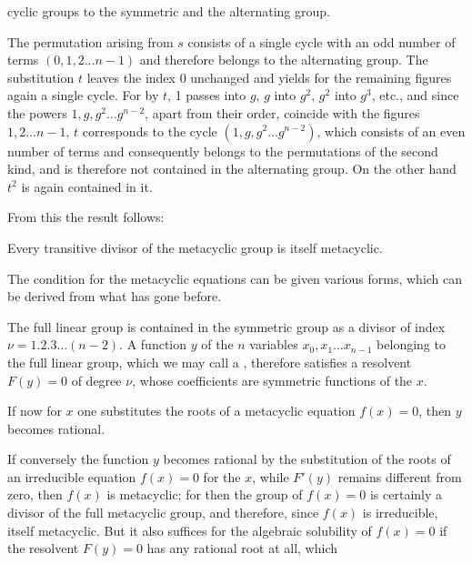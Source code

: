 cyclic groups to the symmetric and the alternating group.

The permutation arising from $s$ consists of a single cycle with an odd number of terms $(0, 1, 2 \ldots n-1)$ and therefore belongs to the alternating group. The substitution $t$ leaves the index 0 unchanged and yields for the remaining figures again a single cycle. For by $t$, 1 passes into $g$, $g$ into $g^2$, $g^2$ into $g^3$, etc., and since the powers $1, g, g^2 \ldots g^{n-2}$, apart from their order, coincide with the figures $1, 2 \ldots n-1$, $t$ corresponds to the cycle $(1, g, g^2 \ldots g^{n-2})$, which consists of an even number of terms and consequently belongs to the permutations of the second kind, and is therefore not contained in the alternating group. On the other hand $t^2$ is again contained in it.

From this the result follows:


Every transitive divisor of the metacyclic group is itself metacyclic.

The condition for the metacyclic equations can be given various forms, which can be derived from what has gone before.

The full linear group is contained in the symmetric group as a divisor of index $\nu = 1 . 2 . 3 \ldots (n-2)$. A function $y$ of the $n$ variables $x_0, x_1 \ldots x_{n-1}$ belonging to the full linear group, which we may call a , therefore satisfies a resolvent $F(y)=0$ of degree $\nu$, whose coefficients are symmetric functions of the $x$.

If now for $x$ one substitutes the roots of a metacyclic equation $f(x)=0$, then $y$ becomes rational.

If conversely the function $y$ becomes rational by the substitution of the roots of an irreducible equation $f(x)=0$ for the $x$, while $F'(y)$ remains different from zero, then $f(x)$ is metacyclic; for then the group of $f(x)=0$ is certainly a divisor of the full metacyclic group, and therefore, since $f(x)$ is irreducible, itself metacyclic. But it also suffices for the algebraic solubility of $f(x)=0$ if the resolvent $F(y)=0$ has any rational root at all, which
